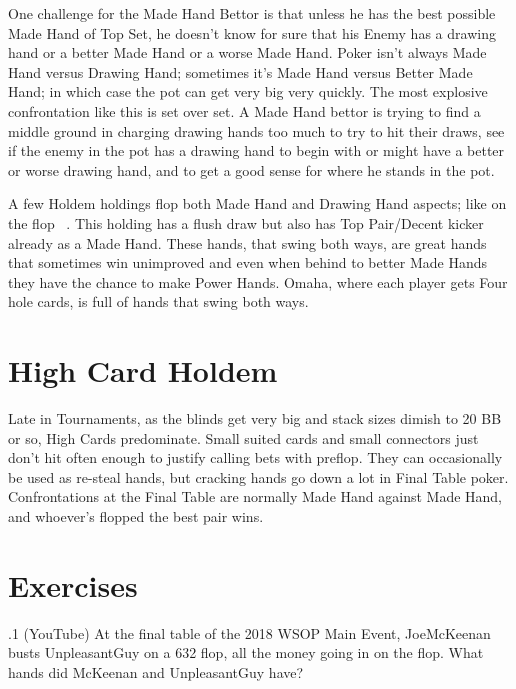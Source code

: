 One challenge for the Made Hand Bettor is that unless he has the best
possible Made Hand of Top Set, he doesn't know for sure that his
Enemy has a drawing hand or a better Made Hand or a worse Made
Hand. Poker isn't always Made Hand versus Drawing Hand; sometimes it's
Made Hand versus Better Made Hand; in which case the pot can get very
big very quickly. The most explosive confrontation like this is set
over set. A Made Hand bettor is trying to find a middle ground in
charging drawing hands too much to try to hit their draws, see if the
enemy in the pot has a drawing hand to begin with or might have a
better or worse drawing hand, and to get a good sense for where he
stands in the pot.

A few Holdem holdings flop both Made Hand and Drawing Hand aspects;
like \Kh\Th on the flop \Kc\nineh\eigh\ . This holding has a flush
draw but also has Top Pair/Decent kicker already as a Made Hand. These
hands, that swing both ways, are great hands that sometimes win
unimproved and even when behind to better Made Hands they have the
chance to make Power Hands. Omaha, where each player gets Four hole
cards, is full of hands that swing both ways.

\section{High Card Holdem}

Late in Tournaments, as the blinds get very big and stack sizes dimish
to 20 BB or so, High Cards predominate. Small suited cards and small
connectors just don't hit often enough to justify calling bets with
preflop. They can occasionally be used as re-steal hands, but cracking
hands go down a lot in Final Table poker. Confrontations at the Final
Table are normally Made Hand against Made Hand, and whoever's flopped
the best pair wins.

\section{Exercises}


.1 (YouTube) At the final table of the 2018 WSOP Main
Event, JoeMcKeenan busts UnpleasantGuy on a 632 flop, all the money
going in on the flop. What hands did McKeenan and UnpleasantGuy have?
